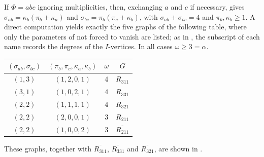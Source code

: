 \documentclass[11pt]{article}
\begin{document}
If $\Phi=abc$ ignoring multiplicities, then, exchanging $a$ and $c$ if necessary,  gives $\sigma_{ab}=\kappa_b(\pi_b+\kappa_a)$ and $\sigma_{bc}=\pi_b(\pi_c+\kappa_b)$, with $\sigma_{ab}+\sigma_{bc}=4$ and $\pi_b,\kappa_b\geq 1$. A direct computation yields exactly the five graphs of the following table, where only the parameters of  not forced to vanish are listed; as in , the subscript of each name records the degrees of the $I$-vertices. In all cases $\omega\geq 3=\alpha$.
\begin{center}
	\begin{tabular}{cccc}
		\hline
		$(\sigma_{ab},\sigma_{bc})$ & $(\pi_b,\pi_c,\kappa_a,\kappa_b)$ & $\omega$ & $G$ \\
		\hline
		$(1,3)$ & $(1,2,0,1)$ & $4$ & $R_{311}$ \\
		$(3,1)$ & $(1,0,2,1)$ & $4$ & $R_{331}$ \\
		$(2,2)$ & $(1,1,1,1)$ & $4$ & $R_{321}$ \\
		$(2,2)$ & $(2,0,0,1)$ & $3$ & $R_{211}$ \\
		$(2,2)$ & $(1,0,0,2)$ & $3$ & $\overline{R_{211}}$ \\
		\hline
	\end{tabular}
\end{center}
These graphs, together with $\overline{R_{311}}$, $\overline{R_{331}}$ and $\overline{R_{321}}$, are shown in .
\end{document}
